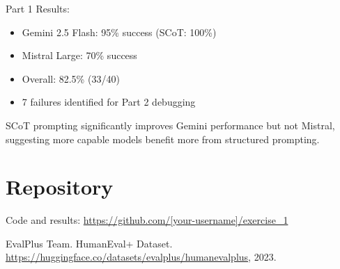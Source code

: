 \documentclass[11pt]{article}
\begin{document}
Part 1 Results:
\begin{itemize}
    \item Gemini 2.5 Flash: 95\% success (SCoT: 100\%)
    \item Mistral Large: 70\% success
    \item Overall: 82.5\% (33/40)
    \item 7 failures identified for Part 2 debugging
\end{itemize}

SCoT prompting significantly improves Gemini performance but not Mistral, suggesting more capable models benefit more from structured prompting.

\section{Repository}

Code and results: \url{https://github.com/[your-username]/exercise_1}

\begin{thebibliography}{9}
EvalPlus Team. HumanEval+ Dataset. \url{https://huggingface.co/datasets/evalplus/humanevalplus}, 2023.
\end{thebibliography}
\end{document}
